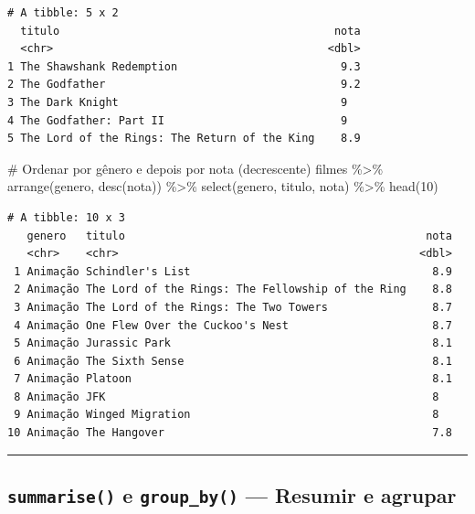 \documentclass[
  letterpaper,
]{scrbook}
\newenvironment{Shaded}{\begin{snugshade}}{\end{snugshade}}
\newcommand{\CommentTok}[1]{\textcolor[rgb]{0.37,0.37,0.37}{#1}}
\newcommand{\DecValTok}[1]{\textcolor[rgb]{0.68,0.00,0.00}{#1}}
\newcommand{\FunctionTok}[1]{\textcolor[rgb]{0.28,0.35,0.67}{#1}}
\newcommand{\NormalTok}[1]{\textcolor[rgb]{0.00,0.23,0.31}{#1}}
\newcommand{\SpecialCharTok}[1]{\textcolor[rgb]{0.37,0.37,0.37}{#1}}
\begin{document}
\begin{verbatim}
# A tibble: 5 x 2
  titulo                                          nota
  <chr>                                          <dbl>
1 The Shawshank Redemption                         9.3
2 The Godfather                                    9.2
3 The Dark Knight                                  9  
4 The Godfather: Part II                           9  
5 The Lord of the Rings: The Return of the King    8.9
\end{verbatim}

\begin{Shaded}
\begin{Highlighting}[]
\CommentTok{\# Ordenar por gênero e depois por nota (decrescente)}
\NormalTok{filmes }\SpecialCharTok{\%\textgreater{}\%} 
  \FunctionTok{arrange}\NormalTok{(genero, }\FunctionTok{desc}\NormalTok{(nota)) }\SpecialCharTok{\%\textgreater{}\%} 
  \FunctionTok{select}\NormalTok{(genero, titulo, nota) }\SpecialCharTok{\%\textgreater{}\%} 
  \FunctionTok{head}\NormalTok{(}\DecValTok{10}\NormalTok{)}
\end{Highlighting}
\end{Shaded}

\begin{verbatim}
# A tibble: 10 x 3
   genero   titulo                                              nota
   <chr>    <chr>                                              <dbl>
 1 Animação Schindler's List                                     8.9
 2 Animação The Lord of the Rings: The Fellowship of the Ring    8.8
 3 Animação The Lord of the Rings: The Two Towers                8.7
 4 Animação One Flew Over the Cuckoo's Nest                      8.7
 5 Animação Jurassic Park                                        8.1
 6 Animação The Sixth Sense                                      8.1
 7 Animação Platoon                                              8.1
 8 Animação JFK                                                  8  
 9 Animação Winged Migration                                     8  
10 Animação The Hangover                                         7.8
\end{verbatim}

\begin{center}\rule{0.5\linewidth}{0.5pt}\end{center}

\subsection{\texorpdfstring{\texttt{summarise()} e \texttt{group\_by()}
--- Resumir e
agrupar}{summarise() e group\_by() --- Resumir e agrupar}}\label{summarise-e-group_by-resumir-e-agrupar}
\end{document}
